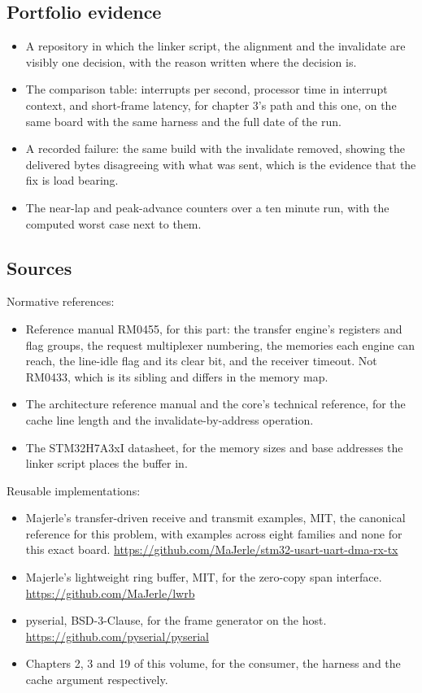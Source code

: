 \subsection*{Portfolio evidence}

\begin{itemize}
\item A repository in which the linker script, the alignment and the invalidate
are visibly one decision, with the reason written where the decision is.
\item The comparison table: interrupts per second, processor time in interrupt
context, and short-frame latency, for chapter 3's path and this one, on the same
board with the same harness and the full date of the run.
\item A recorded failure: the same build with the invalidate removed, showing
the delivered bytes disagreeing with what was sent, which is the evidence that
the fix is load bearing.
\item The near-lap and peak-advance counters over a ten minute run, with the
computed worst case next to them.
\end{itemize}

\subsection*{Sources}

Normative references:
\begin{itemize}
\item Reference manual RM0455, for this part: the transfer engine's registers
and flag groups, the request multiplexer numbering, the memories each engine can
reach, the line-idle flag and its clear bit, and the receiver timeout. Not
RM0433, which is its sibling and differs in the memory map.
\item The architecture reference manual and the core's technical reference, for
the cache line length and the invalidate-by-address operation.
\item The STM32H7A3xI datasheet, for the memory sizes and base addresses the
linker script places the buffer in.
\end{itemize}

Reusable implementations:
\begin{itemize}
\item Majerle's transfer-driven receive and transmit examples, MIT, the
canonical reference for this problem, with examples across eight families and
none for this exact board.\newline
\url{https://github.com/MaJerle/stm32-usart-uart-dma-rx-tx}
\item Majerle's lightweight ring buffer, MIT, for the zero-copy span
interface.\newline
\url{https://github.com/MaJerle/lwrb}
\item pyserial, BSD-3-Clause, for the frame generator on the host.\newline
\url{https://github.com/pyserial/pyserial}
\item Chapters 2, 3 and 19 of this volume, for the consumer, the harness and the
cache argument respectively.
\end{itemize}
